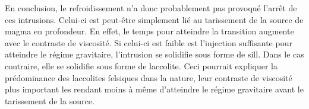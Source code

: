 En conclusion,  le refroidissement n’a donc  probablement pas provoqué
l’arrêt de  ces intrusions. Celui-ci  est peut-être simplement  lié au
tarissement de  la source de magma  en profondeur. En effet,  le temps
pour atteindre la transition augmente  avec le contraste de viscosité.
Si celui-ci  est faible est  l'injection suffisante pour  atteindre le
régime gravitaire, l'intrusion  se solidifie sous forme  de sill. Dans
le  cas contraire,  elle se  solidifie sous  forme de  laccolite. Ceci
pourrait expliquer  la prédominance  des laccolites felsiques  dans la
nature, leur contraste de viscosité plus important les rendant moins à
même  d'atteindre le  régime  gravitaire avant  le  tarissement de  la
source.


